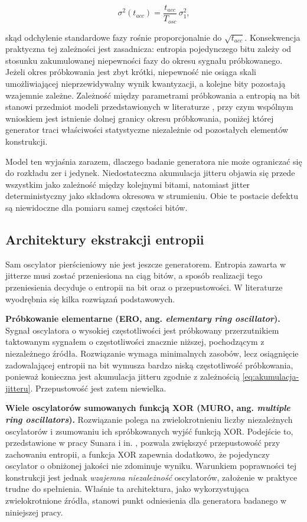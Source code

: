 \begin{equation}
  \sigma^2(t_{acc}) = \frac{t_{acc}}{T_{osc}}\,\sigma_1^{2},
  \label{eq:akumulacja-jitteru}
\end{equation}

skąd odchylenie standardowe fazy rośnie proporcjonalnie do
$\sqrt{t_{acc}}$. Konsekwencja praktyczna tej zależności jest zasadnicza:
entropia pojedynczego bitu zależy od stosunku zakumulowanej niepewności
fazy do okresu sygnału próbkowanego. Jeżeli okres próbkowania jest zbyt
krótki, niepewność nie osiąga skali umożliwiającej nieprzewidywalny wynik
kwantyzacji, a kolejne bity pozostają wzajemnie zależne. Zależność między
parametrami próbkowania a entropią na bit stanowi przedmiot modeli
przedstawionych w literaturze \cite{ma2014entropy,saarinen2021entropy},
przy czym wspólnym wnioskiem jest istnienie dolnej granicy okresu
próbkowania, poniżej której generator traci właściwości statystyczne
niezależnie od pozostałych elementów konstrukcji.

Model ten wyjaśnia zarazem, dlaczego badanie generatora nie może ograniczać
się do rozkładu zer i jedynek. Niedostateczna akumulacja jitteru objawia się
przede wszystkim jako zależność między kolejnymi bitami, natomiast jitter
deterministyczny jako składowa okresowa w strumieniu. Obie te postacie
defektu są niewidoczne dla pomiaru samej częstości bitów.

\subsection{Architektury ekstrakcji entropii}

Sam oscylator pierścieniowy nie jest jeszcze generatorem. Entropia zawarta
w jitterze musi zostać przeniesiona na ciąg bitów, a sposób realizacji tego
przeniesienia decyduje o entropii na bit oraz o przepustowości. W literaturze
wyodrębnia się kilka rozwiązań podstawowych.

\textbf{Próbkowanie elementarne (ERO, ang. \emph{elementary ring oscillator}).}
Sygnał oscylatora o wysokiej częstotliwości jest próbkowany przerzutnikiem
taktowanym sygnałem o częstotliwości znacznie niższej, pochodzącym
z niezależnego źródła. Rozwiązanie wymaga minimalnych zasobów, lecz osiągnięcie
zadowalającej entropii na bit wymusza bardzo niską częstotliwość próbkowania,
ponieważ konieczna jest akumulacja jitteru zgodnie
z zależnością \eqref{eq:akumulacja-jitteru}. Przepustowość jest zatem
niewielka.

\textbf{Wiele oscylatorów sumowanych funkcją XOR (MURO, ang. \emph{multiple
ring oscillators}).} Rozwiązanie polega na zwielokrotnieniu liczby
niezależnych oscylatorów i zsumowaniu ich spróbkowanych wyjść funkcją XOR.
Podejście to, przedstawione w pracy Sunara i in. \cite{sunar2006provably},
pozwala zwiększyć przepustowość przy zachowaniu entropii, a funkcja XOR
zapewnia dodatkowo, że pojedynczy oscylator o obniżonej jakości nie
zdominuje wyniku. Warunkiem poprawności tej konstrukcji jest jednak
\emph{wzajemna niezależność} oscylatorów, założenie w praktyce trudne do
spełnienia.
Właśnie ta architektura, jako wykorzystująca zwielokrotnione źródła,
stanowi punkt odniesienia dla generatora badanego w niniejszej pracy.


